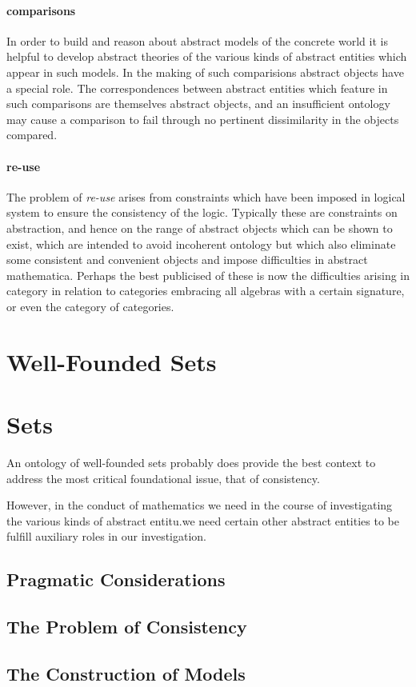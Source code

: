 \paragraph{comparisons}

In order to build and reason about abstract models of the concrete world it is helpful to develop abstract theories of the various kinds of abstract entities which appear in such models.
In the making of such comparisions abstract objects have a special role.
The correspondences between abstract entities which feature in such comparisons are themselves abstract objects, and an insufficient ontology may cause a comparison to fail through no pertinent dissimilarity in the objects compared.

\paragraph{re-use}

The problem of \emph{re-use} arises from constraints which have been imposed in logical system to ensure the consistency of the logic.
Typically these are constraints on abstraction, and hence on the range of abstract objects which can be shown to exist, which are intended to avoid incoherent ontology but which also eliminate some consistent and convenient objects and impose difficulties in abstract mathematica.
Perhaps the best publicised of these is now the difficulties arising in category in relation to categories embracing all algebras with a certain signature, or even the category of categories.


\section{Well-Founded Sets}

\section{Sets}

An ontology of well-founded sets probably does provide the best context to address the most critical foundational issue, that of consistency.

However, in the conduct of mathematics we need in the course of investigating the various kinds of abstract entitu.we need certain other abstract entities to be fulfill auxiliary roles in our investigation.


\subsection{Pragmatic Considerations}

\subsection{The Problem of Consistency}

\subsection{The Construction of Models} 
